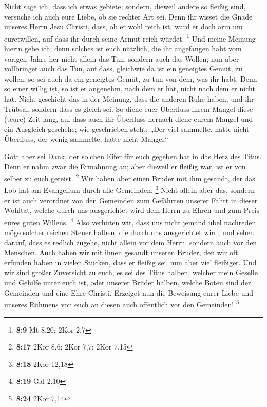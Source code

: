  Nicht sage ich, dass ich etwas gebiete; sondern, dieweil
andere so fleißig sind, versuche ich auch eure Liebe, ob sie rechter Art
sei.  Denn ihr wisset die Gnade unseres Herrn Jesu
Christi, dass, ob er wohl reich ist, ward er doch arm um euretwillen,
auf dass ihr durch seine Armut reich würdet. \footnote{\textbf{8:9} Mt
  8,20; 2Kor 2,7}  Und meine Meinung hierin gebe ich;
denn solches ist euch nützlich, die ihr angefangen habt vom vorigen
Jahre her nicht allein das Tun, sondern auch das Wollen; 
nun aber vollbringet auch das Tun, auf dass, gleichwie da ist ein
geneigtes Gemüt, zu wollen, so sei auch da ein geneigtes Gemüt, zu tun
von dem, was ihr habt.  Denn so einer willig ist, so ist
er angenehm, nach dem er hat, nicht nach dem er nicht hat.
 Nicht geschieht das in der Meinung, dass die anderen
Ruhe haben, und ihr Trübsal, sondern dass es gleich sei. 
So diene euer Überfluss ihrem Mangel diese (teure) Zeit lang, auf dass
auch ihr Überfluss hernach diene eurem Mangel und ein Ausgleich
geschehe;  wie geschrieben steht: „Der viel sammelte,
hatte nicht Überfluss, der wenig sammelte, hatte nicht Mangel.``

 Gott aber sei Dank, der solchen Eifer für euch gegeben
hat in das Herz des Titus.  Denn er nahm zwar die
Ermahnung an; aber dieweil er fleißig war, ist er von selber zu euch
gereist. \footnote{\textbf{8:17} 2Kor 8,6; 2Kor 7,7; 2Kor 7,15}
 Wir haben aber einen Bruder mit ihm gesandt, der das Lob
hat am Evangelium durch alle Gemeinden. \footnote{\textbf{8:18} 2Kor
  12,18}  Nicht allein aber das, sondern er ist auch
verordnet von den Gemeinden zum Gefährten unserer Fahrt in dieser
Wohltat, welche durch uns ausgerichtet wird dem Herrn zu Ehren und zum
Preis eures guten Willens. \footnote{\textbf{8:19} Gal 2,10}
 Also verhüten wir, dass uns nicht jemand übel nachreden
möge solcher reichen Steuer halben, die durch uns ausgerichtet wird;
 und sehen darauf, dass es redlich zugehe, nicht allein
vor dem Herrn, sondern auch vor den Menschen.  Auch haben
wir mit ihnen gesandt unseren Bruder, den wir oft erfunden haben in
vielen Stücken, dass er fleißig sei, nun aber viel fleißiger.
 Und wir sind großer Zuversicht zu euch, es sei des Titus
halben, welcher mein Geselle und Gehilfe unter euch ist, oder unserer
Brüder halben, welche Boten sind der Gemeinden und eine Ehre Christi.
 Erzeiget nun die Beweisung eurer Liebe und unseres
Rühmens von euch an diesen auch öffentlich vor den Gemeinden!
\footnote{\textbf{8:24} 2Kor 7,14}

